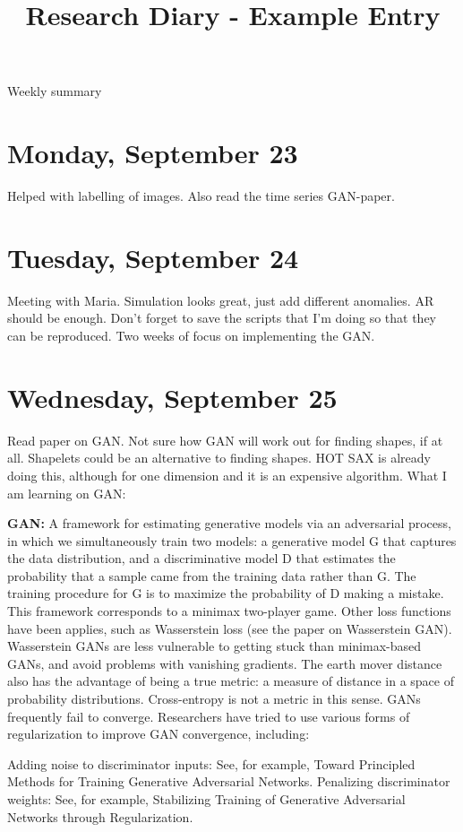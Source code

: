 \documentclass[11pt,letterpaper]{article}
\begin{document}
\univlogo

\title{Research Diary - Example Entry}

{\Huge Weekly summary}\\[5mm]

\section*{Monday, September 23}
Helped with labelling of images. Also read the time series GAN-paper.

\section*{Tuesday, September 24}
Meeting with Maria. Simulation looks great, just add different anomalies. AR should be enough. 
Don't forget to save the scripts that I'm doing so that they can be reproduced. Two weeks of focus on implementing the GAN.

\section*{Wednesday, September 25}
Read paper on GAN. Not sure how GAN will work out for finding shapes, if at all. Shapelets could be an alternative to finding shapes. HOT SAX is already doing this, although for one dimension and it is an expensive algorithm. 
What I am learning on GAN:

\textbf{GAN:}
A framework for estimating generative models via an adversarial process, in which we simultaneously train two models: a generative model G that captures the data distribution, and a discriminative model D that estimates the probability that a sample came from the training data rather than G. The training procedure for G is to maximize the probability of D making a mistake. This framework corresponds to a minimax two-player game. Other loss functions have been applies, such as Wasserstein loss (see the paper on Wasserstein GAN). Wasserstein GANs are less vulnerable to getting stuck than minimax-based GANs, and avoid problems with vanishing gradients. The earth mover distance also has the advantage of being a true metric: a measure of distance in a space of probability distributions. Cross-entropy is not a metric in this sense. GANs frequently fail to converge. Researchers have tried to use various forms of regularization to improve GAN convergence, including:

Adding noise to discriminator inputs: See, for example, Toward Principled Methods for Training Generative Adversarial Networks.
Penalizing discriminator weights: See, for example, Stabilizing Training of Generative Adversarial Networks through Regularization.
\end{document}
